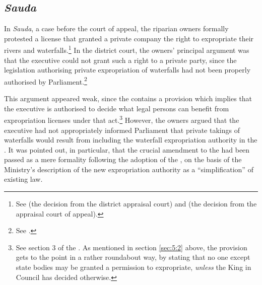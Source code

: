 


\subsection{{\it Sauda}}\label{sec:5:5:1}

In {\it Sauda}, a case before the court of appeal, the riparian owners formally protested a license that granted a private company the right to expropriate their rivers and waterfalls.\footnote{See \cite{sauda07} (the decision from the district appraisal court) and \cite{sauda09} (the decision from the appraisal court of appeal).} In the district court, the owners' principal argument was that the executive could not grant such a right to a private party, since the legislation authorising private expropriation of waterfalls had not been properly authorised by Parliament.\footnote{See \cite{sauda07}.}

This argument appeared weak, since the \cite{ea59} contains a provision which implies that the executive is authorised to decide what legal persons can benefit from expropriation licenses under that act.\footnote{See section 3 of the \cite{ea59}. As mentioned in section \ref{sec:5:2} above, the provision gets to the point in a rather roundabout way, by stating that no one except state bodies may be granted a permission to expropriate, {\it unless} the King in Council has decided otherwise.} However, the owners argued that the executive had not appropriately informed Parliament that private takings of waterfalls would result from including the waterfall expropriation authority in the \cite{ea59}. It was pointed out, in particular, that the crucial amendment to the \cite{ea59} had been passed as a mere formality following the adoption of the \cite{wra00}, on the basis of the Ministry's description of the new expropriation authority as a ``simplification'' of existing law.

